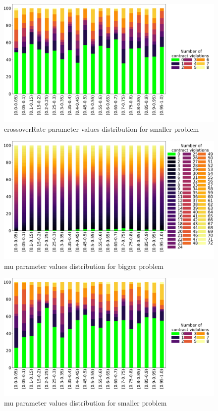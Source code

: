 \begin{figure}
	\centering
	\includegraphics[width=\textwidth]{images/DistrValiditySmall/crossoverRate.pdf}
	\caption[crossoverRate parameter values distribution for smaller problem]{crossoverRate parameter values distribution for smaller problem}
	\label{fig:crossoverRate_DistSmall}
\end{figure}
\begin{figure}
	\centering
	\includegraphics[width=\textwidth]{images/DistrValidityBig/mu.pdf}
	\caption[mu parameter values distribution for bigger problem]{mu parameter values distribution for bigger problem}
	\label{fig:mu_DistBig}
\end{figure}
\begin{figure}
	\centering
	\includegraphics[width=\textwidth]{images/DistrValiditySmall/mu.pdf}
	\caption[mu parameter values distribution for smaller problem]{mu parameter values distribution for smaller problem}
	\label{fig:mu_DistSmall}
\end{figure}
